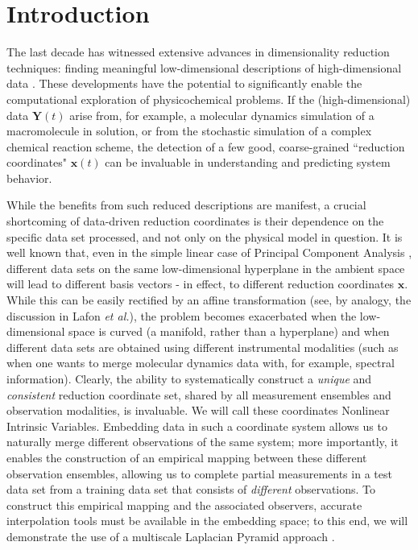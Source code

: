 \documentclass[aip,jcp,preprint]{revtex4-1}
\begin{document}

\maketitle

\section{Introduction}
The last decade has witnessed extensive advances in dimensionality reduction techniques:
finding meaningful low-dimensional descriptions of high-dimensional data \cite{Tenenbaum2000,Roweis2000,Donoho2003,Belkin2003,Coifman2006}.
%
These developments have the potential to significantly enable the computational exploration
of physicochemical problems.
%
If the (high-dimensional) data $\mathbf{Y}(t)$ arise from, for example, a
molecular dynamics simulation of a macromolecule in solution, or from the stochastic
simulation of a complex chemical reaction scheme, the detection of a few good, coarse-grained
``reduction coordinates" $\mathbf{x}(t)$ can be invaluable in understanding and predicting system behavior.

While the benefits from such reduced descriptions are manifest, a crucial shortcoming of
 data-driven reduction coordinates is their dependence on the specific data set processed,
and not only on the physical model in question.
%
It is well known that, even in the simple linear case of Principal Component Analysis \cite{jolliffe2005principal},
different data sets on the same low-dimensional hyperplane in the ambient space
will lead to different basis vectors - in effect, to different reduction coordinates $\mathbf{x}$.
%
While this can be easily rectified by an affine transformation
(see, by analogy, the discussion in Lafon {\em et al.}\cite{lafon2006data}),
the problem becomes
exacerbated when the low-dimensional space is curved (a manifold, rather than a hyperplane)
and when different data sets are obtained using different instrumental modalities
(such as when one wants to merge molecular dynamics data with, for example, spectral information).
%
Clearly, the ability to systematically construct a {\em unique} and {\em consistent} reduction
coordinate set, shared by all measurement ensembles and observation modalities, is invaluable.
%
We will call these coordinates Nonlinear Intrinsic Variables.
%
Embedding data in such a coordinate system allows us to naturally merge different observations of the same system;
more importantly, it enables the construction of an empirical mapping between these different
observation ensembles, allowing us to complete partial measurements in a test data set from a training data set
that consists of {\em different} observations.
%
To construct this empirical mapping and the associated observers,
accurate interpolation tools must be available in the embedding space; to this
end, we will demonstrate the use of a multiscale Laplacian Pyramid approach \cite{rabin2012heterogeneous}.
\end{document}
